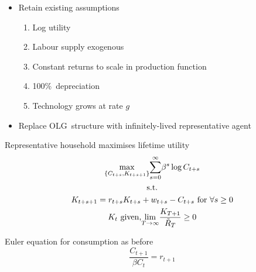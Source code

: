 \documentclass[notes=show]{beamer}
\begin{document}
\begin{frame}%


\begin{itemize}
\item Retain existing assumptions

\begin{enumerate}
\item Log utility

\item Labour supply exogenous

\item Constant returns to scale in production function

\item 100\%\ depreciation

\item Technology grows at rate $g$
\end{enumerate}

\item Replace OLG\ structure with infinitely-lived representative agent
\end{itemize}

\end{frame}%

\begin{frame}%


Representative household maximises lifetime utility%
\begin{gather*}
\underset{\{C_{t+s},K_{t+s+1}\}}{\max }\underset{s=0}{\overset{\infty }{\sum 
}}\beta ^{s}\log C_{t+s} \\
\text{s.t.} \\
K_{t+s+1}=r_{t+s}K_{t+s}+w_{t+s}-C_{t+s}\text{ for }\forall s\geq 0 \\
K_{t}\text{ given,}\underset{T\rightarrow \infty }{\lim }\frac{K_{T+1}}{%
\tilde{R}_{T}}\geq 0
\end{gather*}

Euler equation for consumption as before%
\begin{equation*}
\frac{C_{t+1}}{\beta C_{t}}=r_{t+1}
\end{equation*}

\transboxout%
\end{frame}%
\end{document}
